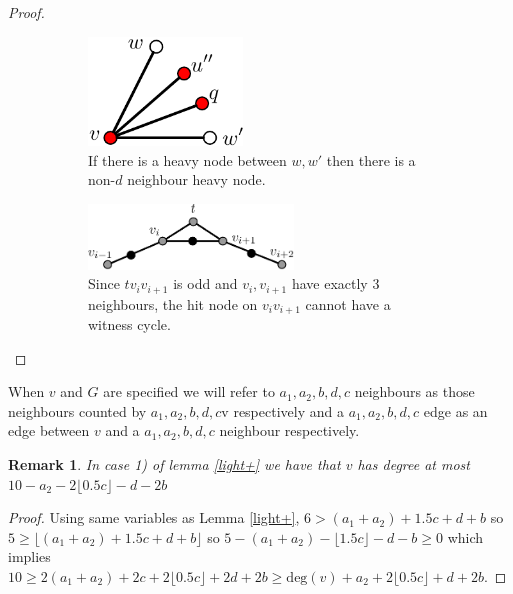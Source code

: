 \documentclass{article}
\newcommand{\0}{\mathbb{0}}
\newcommand{\1}{\mathbb{1}}
\newtheorem{remark}[theorem]{Remark}
\begin{document}
\begin{proof}
\begin{figure}[h]
\begin{center}
     \begin{subfigure}[t]{0.45\textwidth}
      \includegraphics[width=0.45\textwidth]{lastdnode.pdf}    \caption{If there is a heavy node between $w,w'$ then there is a non-$d$ neighbour heavy node.}  \label{lastd}
     \end{subfigure}  %
     \begin{subfigure}[t]{0.6\textwidth}
       \includegraphics[width=0.6\textwidth]{ConHitnode.pdf}
       \caption{Since $t v_i v_{i+1}$ is odd and $v_i, v_{i+1}$ have exactly 3 neighbours, the hit node on $v_iv_{i+1}$ cannot have a witness cycle. }\label{ConHit}
     \end{subfigure} %
     \caption{} \label{}
        \end{center}
\end{figure}
\end{proof}
When $v$ and $G$ are specified we will refer to $a_1,a_2,b,d,c$ neighbours as those neighbours counted by $a_1,a_2,b,d,c$v respectively and a $a_1,a_2,b,d,c$  edge as an edge between $v$ and a $a_1,a_2,b,d,c$ neighbour respectively.
%
\begin{remark}\label{light+r}
In case 1) of lemma \ref{light+} we have that $v$ has degree at most $ 10 - a_2 -2 \lfloor 0.5c \rfloor -d -2b$
\end{remark}
\begin{proof}  Using same variables as Lemma \ref{light+}, $ 6 > (a_1+a_2) +1.5c +d +b $ so $ 5 \geq \lfloor (a_1+a_2) +1.5c +d +b \rfloor $ so  $ 5-(a_1+a_2) - \lfloor 1.5c \rfloor -d -b \geq 0$ which implies $  10 \geq 2(a_1+a_2) +2c +2 \lfloor 0.5c \rfloor +2d +2b \geq \text{deg}(v)  +a_2 +2 \lfloor 0.5c \rfloor +d +2b  $.
\end{proof}
\end{document}
